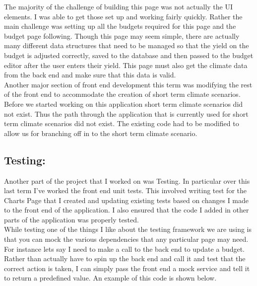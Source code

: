 \documentclass[onecolumn, draftclsnofoot,10pt, compsoc]{article}
\begin{document}
	The majority of the challenge of building this page was not actually the UI elements. I was able to get those set up and working fairly quickly. Rather the main challenge was setting up all the budgets required for this page and the budget page following. Though this page may seem simple, there are actually many different data structures that need to be managed so that the yield on the budget is adjusted correctly, saved to the database and then passed to the budget editor after the user enters their yield. This page must also get the climate data from the back end and make sure that this data is valid.\\
	
	Another major section of front end development this term was modifying the rest of the front end to accommodate the creation of short term climate scenarios. Before we started working on this application short term climate scenarios did not exist. Thus the path through the application that is currently used for short term climate scenarios did not exist. The existing code had to be modified to allow us for branching off in to the short term climate scenario.\\
	
		\subsection{Testing:}
		Another part of the project that I worked on was Testing. In particular over this last term I've worked the front end unit tests. This involved writing test for the Charts Page that I created and updating existing tests based on changes I made to the front end of the application. I also ensured that the code I added in other parts of the application was properly tested.\\
		
		While testing one of the things I like about the testing framework we are using is that you can mock the various dependencies that any particular page may need. For instance lets say I need to make a call to the back end to update a budget. Rather than actually have to spin up the back end and call it and test that the correct action is taken, I can simply pass the front end a mock service and tell it to return a predefined value. An example of this code is shown below.\\
		
\end{document}
